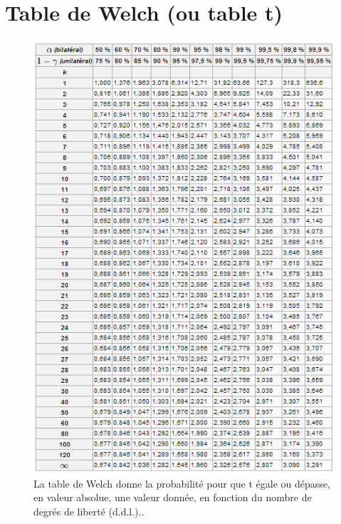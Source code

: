 \documentclass[10pt, oneside, a4paper]{article}
\begin{document}
\section{Table de Welch (ou table t)}
\begin{figure}[!ht]
    \includegraphics[width=\linewidth]{image/table_t}
    \caption{La table de Welch donne la probabilité {\alpha} pour que t égale ou dépasse, en valeur absolue, une valeur donnée, en fonction du nombre de degrés de liberté (d.d.l.)..}
    \label{ann:table_t}
\end{figure}
\end{document}
